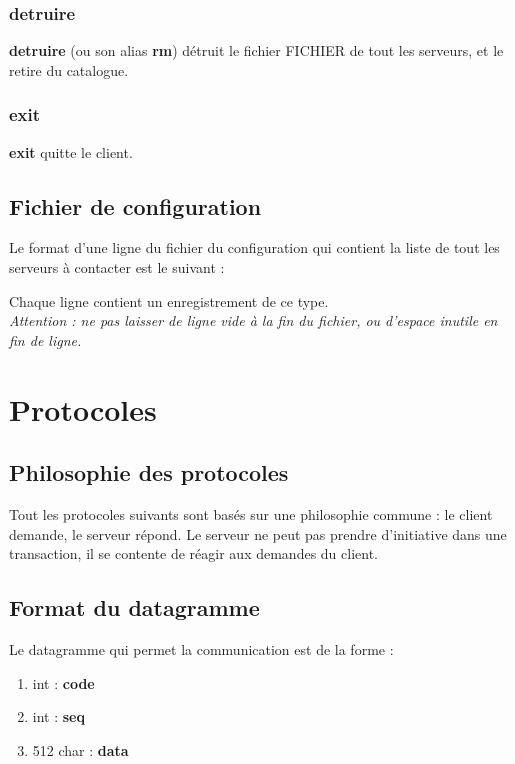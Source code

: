 \documentclass[10pt,a4paper]{article}
\begin{document}
\subsubsection{detruire}
\begin{center}
\end{center}
\textbf{detruire} (ou son alias \textbf{rm}) détruit le fichier FICHIER de tout les serveurs, et le retire du catalogue.

\subsubsection{exit}
\begin{center}
\end{center}
\textbf{exit} quitte le client.

\subsection{Fichier de configuration}

Le format d'une ligne du fichier du configuration qui contient la liste de tout les serveurs à contacter est le suivant :
\begin{center}
\end{center}
Chaque ligne contient un enregistrement de ce type.\\
\textit{Attention : ne pas laisser de ligne vide à la fin du fichier, ou d'espace inutile en fin de ligne.}

\newpage

\section{Protocoles}

\subsection{Philosophie des protocoles}
Tout les protocoles suivants sont basés sur une philosophie commune : le client demande, le serveur répond.
Le serveur ne peut pas prendre d'initiative dans une transaction, il se contente de réagir aux demandes du client.
\subsection{Format du datagramme}

Le datagramme qui permet la communication est de la forme :
\begin{enumerate}
 \item int : \textbf{code}
 \item int : \textbf{seq}
 \item 512 char : \textbf{data}
\end{enumerate}
\end{document}
